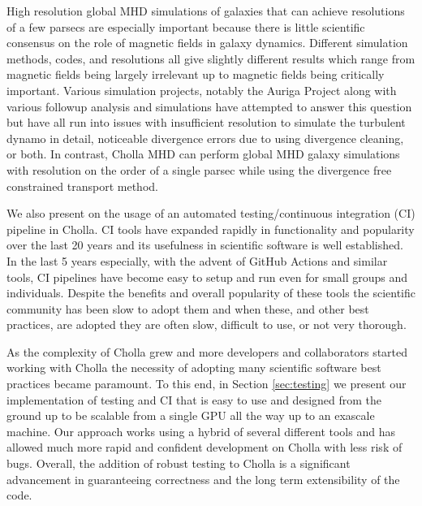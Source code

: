 High resolution global MHD simulations of galaxies that can achieve resolutions of a few parsecs are especially important because there is little scientific consensus on the role of magnetic fields in galaxy dynamics. Different simulation methods, codes, and resolutions all give slightly different results which range from magnetic fields being largely irrelevant up to magnetic fields being critically important\citep{pakmor_faraday_2018,pakmor_simulations_2013,pakmor_magnetic_2017,pakmor_magnetizing_2020,ntormousi_dynamo_2020,van_de_voort_effect_2021}. Various simulation projects, notably the Auriga Project\citep{grand_auriga_2017} along with various followup analysis and simulations \citep{pakmor_faraday_2018,pakmor_simulations_2013,pakmor_magnetic_2017,pakmor_magnetizing_2020,ntormousi_dynamo_2020,van_de_voort_effect_2021} have attempted to answer this question but have all run into issues with insufficient resolution to simulate the turbulent dynamo in detail, noticeable divergence errors due to using divergence cleaning, or both. In contrast, Cholla MHD can perform global MHD galaxy simulations with resolution on the order of a single parsec while using the divergence free constrained transport method.

We also present on the usage of an automated testing/continuous integration (CI) pipeline in Cholla. CI tools have expanded rapidly in functionality and popularity over the last 20 years and its usefulness in scientific software is well established\citep{beck_1999, wilson_2014,wilson_2017}. In the last 5 years especially, with the advent of GitHub Actions and similar tools, CI pipelines have become easy to setup and run even for small groups and individuals. Despite the benefits and overall popularity of these tools the scientific community has been slow to adopt them and when these, and other best practices, are adopted they are often slow, difficult to use, or not very thorough. 

As the complexity of Cholla grew and more developers and collaborators started working with Cholla the necessity of adopting many scientific software best practices became paramount. To this end, in Section \ref{sec:testing} we present our implementation of testing and CI that is easy to use and designed from the ground up to be scalable from a single GPU all the way up to an exascale machine. Our approach works using a hybrid of several different tools and has allowed much more rapid and confident development on Cholla with less risk of bugs. Overall, the addition of robust testing to Cholla is a significant advancement in guaranteeing correctness and the long term extensibility of the code.

